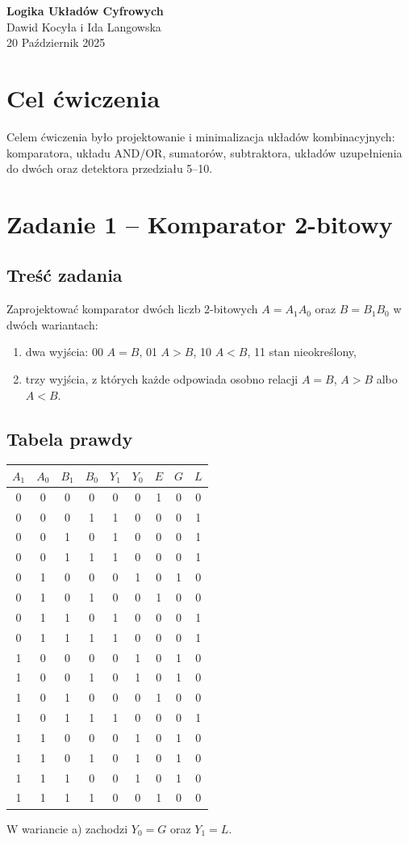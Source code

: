 \documentclass[12pt,a4paper]{article}
\begin{document}
\begin{titlepage}
\centering
\vspace*{0.28\textheight}
{\LARGE \textbf{Logika Układów Cyfrowych}\\[1.3cm]}
{\Large Dawid Kocyła i Ida Langowska\\[0.7cm]}
{\large 20 Październik 2025}
\end{titlepage}
\setcounter{tocdepth}{1}
\tableofcontents
\newpage
\section{Cel ćwiczenia}
Celem ćwiczenia było projektowanie i minimalizacja układów kombinacyjnych: komparatora, układu AND/OR, sumatorów, subtraktora, układów uzupełnienia do dwóch oraz detektora przedziału 5--10.
\section{Zadanie 1 -- Komparator 2-bitowy}
\subsection{Treść zadania}
Zaprojektować komparator dwóch liczb 2-bitowych $A=A_1A_0$ oraz $B=B_1B_0$ w dwóch wariantach:
\begin{enumerate}[label=\alph*)]
\item dwa wyjścia: 00  $A=B$, 01  $A>B$, 10  $A<B$, 11 stan nieokreślony,
\item trzy wyjścia, z których każde odpowiada osobno relacji $A=B$, $A>B$ albo $A<B$.
\end{enumerate}
\subsection{Tabela prawdy}
\begin{center}
\small
\begin{tabular}{cccc|cc|ccc}
\toprule
$A_1$&$A_0$&$B_1$&$B_0$&$Y_1$&$Y_0$&$E$&$G$&$L$\\
\midrule
0&0&0&0&0&0&1&0&0\\
0&0&0&1&1&0&0&0&1\\
0&0&1&0&1&0&0&0&1\\
0&0&1&1&1&0&0&0&1\\
0&1&0&0&0&1&0&1&0\\
0&1&0&1&0&0&1&0&0\\
0&1&1&0&1&0&0&0&1\\
0&1&1&1&1&0&0&0&1\\
1&0&0&0&0&1&0&1&0\\
1&0&0&1&0&1&0&1&0\\
1&0&1&0&0&0&1&0&0\\
1&0&1&1&1&0&0&0&1\\
1&1&0&0&0&1&0&1&0\\
1&1&0&1&0&1&0&1&0\\
1&1&1&0&0&1&0&1&0\\
1&1&1&1&0&0&1&0&0\\
\bottomrule
\end{tabular}
\end{center}
W wariancie a) zachodzi $Y_0=G$ oraz $Y_1=L$.
\end{document}
